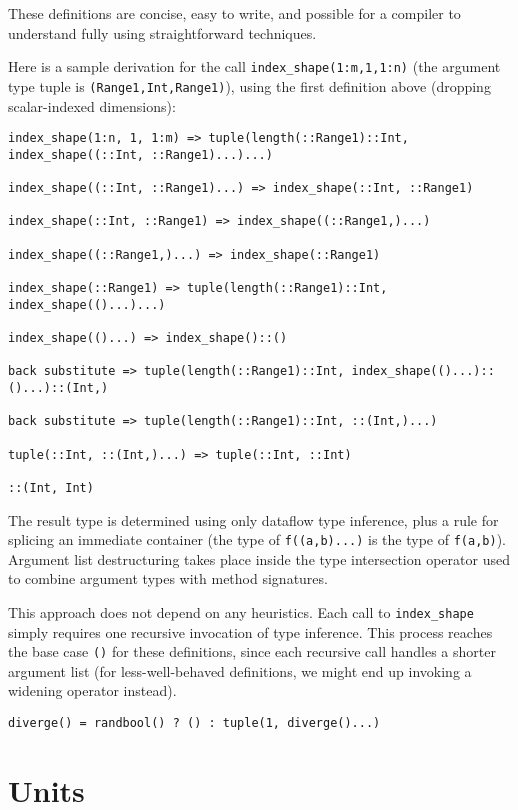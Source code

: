These definitions are concise, easy to write, and possible for a
compiler to understand fully using straightforward techniques.

Here is a sample derivation for the call \texttt{index\_shape(1:m,1,1:n)}
(the argument type tuple is \texttt{(Range1,Int,Range1)}), using the first
definition above (dropping scalar-indexed dimensions):

\begin{verbatim}
index_shape(1:n, 1, 1:m) => tuple(length(::Range1)::Int, index_shape((::Int, ::Range1)...)...)

index_shape((::Int, ::Range1)...) => index_shape(::Int, ::Range1)

index_shape(::Int, ::Range1) => index_shape((::Range1,)...)

index_shape((::Range1,)...) => index_shape(::Range1)

index_shape(::Range1) => tuple(length(::Range1)::Int, index_shape(()...)...)

index_shape(()...) => index_shape()::()

back substitute => tuple(length(::Range1)::Int, index_shape(()...)::()...)::(Int,)

back substitute => tuple(length(::Range1)::Int, ::(Int,)...)

tuple(::Int, ::(Int,)...) => tuple(::Int, ::Int)

::(Int, Int)

\end{verbatim}

The result type is determined using only dataflow type inference, plus a
rule for splicing an immediate container (the type of \texttt{f((a,b)...)} is
the type of \texttt{f(a,b)}). Argument list destructuring takes place inside
the type intersection operator used to combine argument types with method
signatures.

This approach does not depend on any heuristics. Each call to \texttt{index\_shape}
simply requires one recursive invocation of type inference. This process reaches
the base case \texttt{()} for these definitions, since each recursive call
handles a shorter argument list (for less-well-behaved definitions, we might
end up invoking a widening operator instead).


\begin{verbatim}
diverge() = randbool() ? () : tuple(1, diverge()...)
\end{verbatim}



\section{Units}


